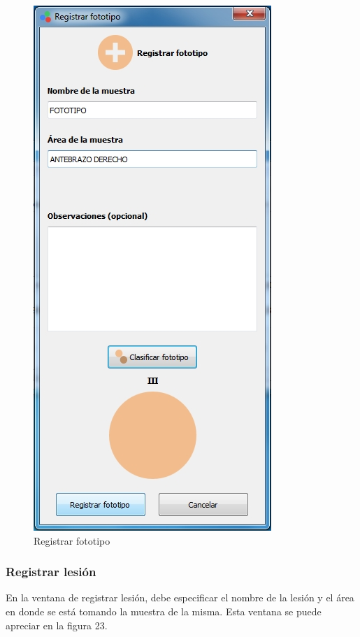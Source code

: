 \begin{figure}[H]
  \centering
  \includegraphics[width=.5\linewidth]{./img/registrar-fototipo2.jpg}
\caption{Registrar fototipo}
\end{figure}
\newpage		
		\subsubsection{Registrar lesi\'{o}n}
			En la ventana de registrar lesi\'{o}n, debe especificar el nombre de la lesi\'{o}n y el \'{a}rea en donde se est\'{a} tomando la muestra de la misma. Esta ventana se puede apreciar en la figura 23.		
		
